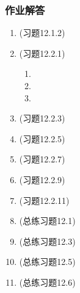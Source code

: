 \documentclass[a4paper,UTF8,fontset=windows,AutoFakeBold]{ctexart}
\theoremstyle{ex}
\begin{document}
\subsubsection{作业解答}
\begin{enumerate}
    \item (习题12.1.2)
    \item (习题12.2.1)
    \begin{enumerate}
        \item[(1)] 
        \item[(3)] 
        \item[(5)] 
    \end{enumerate}
    \item (习题12.2.3)
    \item (习题12.2.5)
    \item (习题12.2.7)
    \item (习题12.2.9)
    \item (习题12.2.11)
    \item (总练习题12.1)
    \item (总练习题12.3)
    \item (总练习题12.5)
    \item (总练习题12.6)
\end{enumerate}
\end{document}
